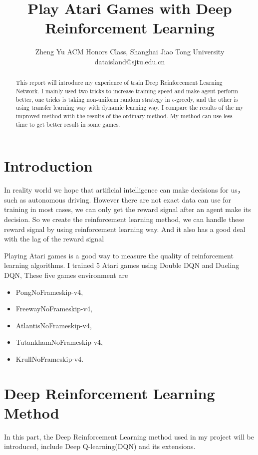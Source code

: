 \documentclass{article}
\title{Play Atari Games with Deep Reinforcement Learning}
\author{
    Zheng Yu
    \affiliations
    ACM Honors Class, Shanghai Jiao Tong University \emails
    dataisland@sjtu.edu.cn
}
\begin{document}
\maketitle

\begin{abstract}
  This report will introduce my experience of train Deep Reinforcement Learning Network. I mainly used two tricks to increase training speed and make agent perform better, one tricks is taking non-uniform random strategy in 
  $\epsilon$-greedy, and the other is using transfer learning way with dynamic learning way. I compare the results of the my improved method with the results of the ordinary method. My method can use less time to get better result in some games.
  
\end{abstract}

\section{Introduction}

In reality world we hope that artificial intelligence can make decisions for us，
such as autonomous driving. However there are not exact data can use for training in most cases,
we can only get the reward signal after an agent make its decision. So we create the reinforcement learning method, we can handle these reward signal by using reinforcement learning
way. And it also has a good deal with the lag of the reward signal

Playing Atari games is a good way to measure the quality of reinforcement learning algorithms.
I trained 5 Atari games using Double DQN and Dueling DQN, These five games environment are 
\begin{itemize}
    \item PongNoFrameskip-v4,
    \item FreewayNoFrameskip-v4,
    \item AtlantisNoFrameskip-v4,
    \item TutankhamNoFrameskip-v4,
    \item KrullNoFrameskip-v4.
\end{itemize}


\section{Deep Reinforcement Learning Method}

In this part, the Deep Reinforcement Learning method used in my project will be introduced, include Deep Q-learning(DQN) and its extensions.
\end{document}
